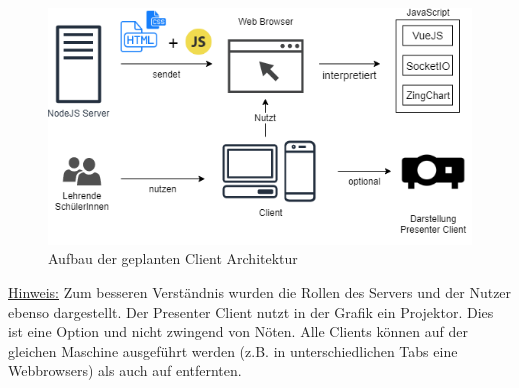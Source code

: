 \begin{figure}[H]
	\centering
	\includegraphics[width=0.8\linewidth]{bilder/client_architektur}
	\caption[Aufbau der geplanten Client Architektur]{Aufbau der geplanten Client Architektur}
	\label{fig:client_diagram}
\end{figure}
\footnotesize \underline{Hinweis:} Zum besseren Verständnis wurden die Rollen des Servers und der Nutzer ebenso dargestellt. Der Presenter Client nutzt in der Grafik ein Projektor. Dies ist eine Option und nicht zwingend von Nöten. Alle Clients können auf der gleichen Maschine ausgeführt werden (z.B. in unterschiedlichen Tabs eine Webbrowsers) als auch auf entfernten. 

\normalsize
